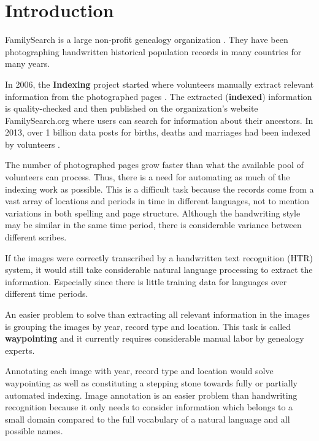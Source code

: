 
\section{Introduction}

FamilySearch is a large non-profit genealogy organization \cite{FamilySearchAbout}. They have been photographing handwritten historical population records in many countries for many years.

In 2006, the \textbf{Indexing} project started where volunteers manually extract relevant information from the photographed pages \cite{Indexing}. The extracted (\textbf{indexed}) information is quality-checked and then published on the organization's website FamilySearch.org where users can search for information about their ancestors.
In 2013, over 1 billion data posts for births, deaths and marriages had been indexed by volunteers \cite{Billion}.

The number of photographed pages grow faster than what the available pool of volunteers can process. Thus, there is a need for automating as much of the indexing work as possible. This is a difficult task because the records come from a vast array of locations and periods in time in different languages, not to mention variations in both spelling and page structure. Although the handwriting style may be similar in the same time period, there is considerable variance between different scribes.

If the images were correctly transcribed by a handwritten text recognition (HTR) system, it would still take considerable natural language processing to extract the information. Especially since there is little training data for languages over different time periods.

An easier problem to solve than extracting all relevant information in the images is grouping the images by year, record type and location. This task is called \textbf{waypointing} \cite{Waypointing} and it currently requires considerable manual labor by genealogy experts.

Annotating each image with year, record type and location would solve waypointing as well as constituting a stepping stone towards fully or partially automated indexing.
Image annotation is an easier problem than handwriting recognition because it only needs to consider information which belongs to a small domain compared to the full vocabulary of a natural language and all possible names.
